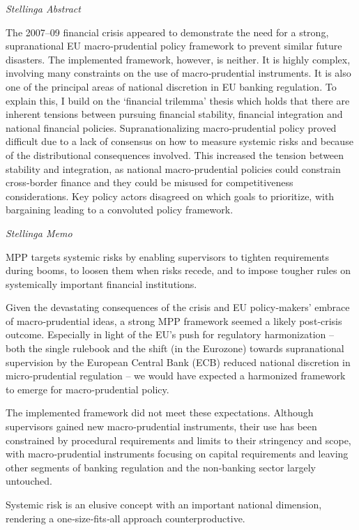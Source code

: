 \documentclass[
]{book}
\begin{document}
\emph{Stellinga Abstract}

The 2007--09 financial crisis appeared to demonstrate the need for a strong, supranational EU macro‐prudential policy framework to prevent similar future disasters. The implemented framework, however, is neither. It is highly complex, involving many constraints on the use of macro‐prudential instruments. It is also one of the principal areas of national discretion in EU banking regulation. To explain this, I build on the `financial trilemma' thesis which holds that there are inherent tensions between pursuing financial stability, financial integration and national financial policies. Supranationalizing macro‐prudential policy proved difficult due to a lack of consensus on how to measure systemic risks and because of the distributional consequences involved. This increased the tension between stability and integration, as national macro‐prudential policies could constrain cross‐border finance and they could be misused for competitiveness considerations. Key policy actors disagreed on which goals to prioritize, with bargaining leading to a convoluted policy framework.

\emph{Stellinga Memo}

MPP targets systemic risks by enabling supervisors to tighten requirements during booms, to loosen them when risks recede, and to impose tougher rules on systemically important financial institutions.

Given the devastating consequences of the crisis and EU policy‐makers' embrace of macro‐prudential ideas, a strong MPP framework seemed a likely post‐crisis outcome. Especially in light of the EU's push for regulatory harmonization -- both the single rulebook and the shift (in the Eurozone) towards supranational supervision by the European Central Bank (ECB) reduced national discretion in micro‐prudential regulation -- we would have expected a harmonized framework to emerge for macro‐prudential policy.

The implemented framework did not meet these expectations.
Although supervisors gained new macro‐prudential instruments, their use has been constrained by procedural requirements and limits to their stringency and scope, with macro‐prudential instruments focusing on capital requirements and leaving other segments of banking regulation and the non‐banking sector largely untouched.

Systemic risk is an elusive concept with an important national dimension, rendering a one‐size‐fits‐all approach counterproductive.
\end{document}

